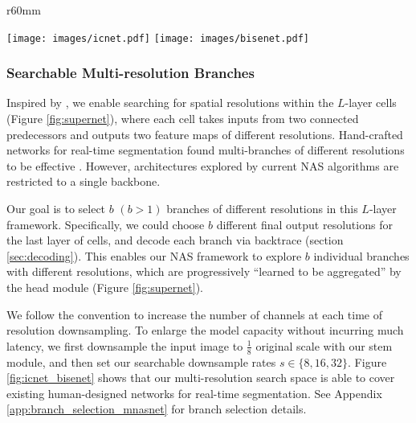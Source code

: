 \documentclass{article} \usepackage{iclr2020_conference,times}
\begin{document}
\begin{wrapfigure}{r}{60mm}
\vspace{-2em}
\begin{center}
	\label{subfig:icnet}
	\texttt{[image: images/icnet.pdf]}
\hfill
	\label{subfig:bisenet}
	\texttt{[image: images/bisenet.pdf]}
\caption{{\small Our multi-resolution search space covers existing manual designs for real-time segmentation (unused cells omitted). Top: ICNet \citep{zhao2018icnet}. Bottom: BiSeNet \citep{yu2018bisenet}}}\label{fig:icnet_bisenet}
\vspace{-2em}
\end{center}
\end{wrapfigure}
\vspace{-1.5em}

\subsubsection{Searchable Multi-resolution Branches}\vspace{-0.5em}

Inspired by \citep{liu2019auto}, we enable searching for spatial resolutions within the $L$-layer cells (Figure \ref{fig:supernet}), where each cell takes inputs from two connected predecessors and outputs two feature maps of different resolutions. Hand-crafted networks for real-time segmentation found multi-branches of different resolutions to be effective \citep{zhao2018icnet,yu2018bisenet}. However, architectures explored by current NAS algorithms are restricted to a single backbone.

Our goal is to select $b$ $(b > 1)$ branches of different resolutions in this $L$-layer framework. Specifically, we could choose $b$ different final output resolutions for the last layer of cells, and decode each branch via backtrace (section \ref{sec:decoding}).
This enables our NAS framework to explore $b$ individual branches with different resolutions, which are progressively ``learned to be aggregated'' by the head module (Figure \ref{fig:supernet}).

We follow the convention to increase the number of channels at each time of resolution downsampling. To enlarge the model capacity without incurring much latency, we first downsample the input image to $\frac{1}{8}$ original scale with our stem module, and then set our searchable downsample rates $s \in \{8, 16, 32\}$. Figure \ref{fig:icnet_bisenet} shows that our multi-resolution search space is able to cover existing human-designed networks for real-time segmentation. See Appendix \ref{app:branch_selection_mnasnet} for branch selection details.
\end{document}

